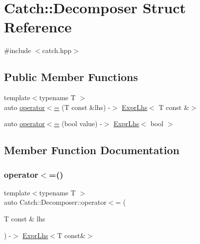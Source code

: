 \hypertarget{structCatch_1_1Decomposer}{}\section{Catch\+:\+:Decomposer Struct Reference}
\label{structCatch_1_1Decomposer}


{\ttfamily \#include $<$catch.\+hpp$>$}

\subsection*{Public Member Functions}
\begin{DoxyCompactItemize}
\item 
{\footnotesize template$<$typename T $>$ }\\auto \mbox{\hyperlink{structCatch_1_1Decomposer_a20b5b8c0e2ff0328a019ae1a8deca03a}{operator$<$=}} (T const \&lhs) -\/$>$ \mbox{\hyperlink{classCatch_1_1ExprLhs}{Expr\+Lhs}}$<$ T const \&$>$
\item 
auto \mbox{\hyperlink{structCatch_1_1Decomposer_aac129b94903ae1339d5709049d83613b}{operator$<$=}} (bool value) -\/$>$ \mbox{\hyperlink{classCatch_1_1ExprLhs}{Expr\+Lhs}}$<$ bool $>$
\end{DoxyCompactItemize}


\subsection{Member Function Documentation}
\mbox{\label{structCatch_1_1Decomposer_a20b5b8c0e2ff0328a019ae1a8deca03a}} 
\subsubsection{\texorpdfstring{operator$<$=()}{operator<=()}\hspace{0.1cm}{\footnotesize\ttfamily [1/2]}}
{\footnotesize\ttfamily template$<$typename T $>$ \\
auto Catch\+::\+Decomposer\+::operator$<$= (\begin{DoxyParamCaption}\item[{T const \&}]{lhs }\end{DoxyParamCaption}) -\/$>$ \mbox{\hyperlink{classCatch_1_1ExprLhs}{Expr\+Lhs}}$<$T const\&$>$ \hspace{0.3cm}{\ttfamily [inline]}}

